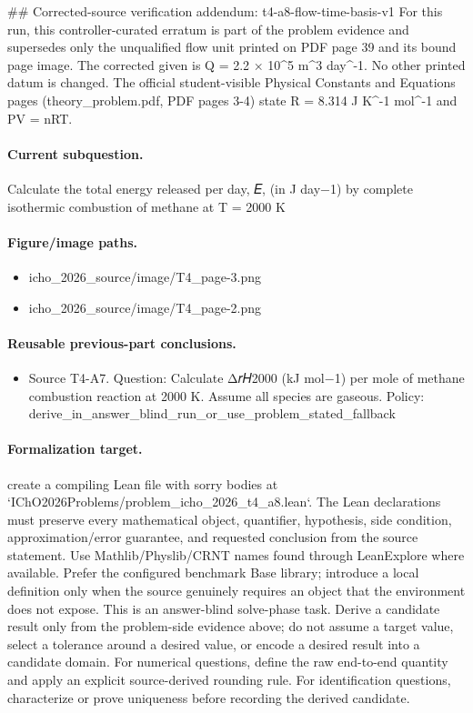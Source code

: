 \#\# Corrected-source verification addendum: t4-a8-flow-time-basis-v1
For this run, this controller-curated erratum is part of the problem evidence and supersedes only the unqualified flow unit printed on PDF page 39 and its bound page image. The corrected given is Q = 2.2 × 10\textasciicircum{}5 m\textasciicircum{}3 day\textasciicircum{}-1. No other printed datum is changed.
The official student-visible Physical Constants and Equations pages (theory\_problem.pdf, PDF pages 3-4) state R = 8.314 J K\textasciicircum{}-1 mol\textasciicircum{}-1 and PV = nRT.

\paragraph{Current subquestion.}
Calculate the total energy released per day, 𝐸, (in J day−1) by complete isothermic combustion of methane at T = 2000 K

\paragraph{Figure/image paths.}
\begin{itemize}
\item icho\_2026\_source/image/T4\_page-3.png
\item icho\_2026\_source/image/T4\_page-2.png
\end{itemize}

\paragraph{Reusable previous-part conclusions.}
\begin{itemize}
\item Source T4-A7. Question: Calculate Δ𝑟𝐻2000 (kJ mol−1) per mole of methane combustion reaction at 2000 K. Assume all species are gaseous. Policy: derive\_in\_answer\_blind\_run\_or\_use\_problem\_stated\_fallback
\end{itemize}

\paragraph{Formalization target.}
create a compiling Lean file with sorry bodies at `IChO2026Problems/problem\_icho\_2026\_t4\_a8.lean`.
The Lean declarations must preserve every mathematical object, quantifier, hypothesis, side condition, approximation/error guarantee, and requested conclusion from the source statement.
Use Mathlib/Physlib/CRNT names found through LeanExplore where available. Prefer the configured benchmark Base library; introduce a local definition only when the source genuinely requires an object that the environment does not expose.
This is an answer-blind solve-phase task. Derive a candidate result only from the problem-side evidence above; do not assume a target value, select a tolerance around a desired value, or encode a desired result into a candidate domain.
For numerical questions, define the raw end-to-end quantity and apply an explicit source-derived rounding rule. For identification questions, characterize or prove uniqueness before recording the derived candidate.


